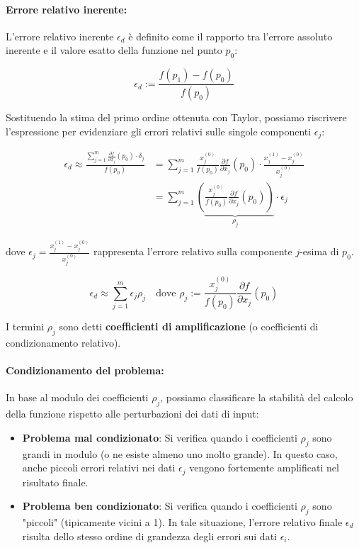 \documentclass[a4paper,12pt]{article}
\begin{document}
	\paragraph{Errore relativo inerente:}
	L'errore relativo inerente $\epsilon_d$ è definito come il rapporto tra l'errore assoluto inerente e il valore esatto della funzione nel punto $p_0$:
	
	\begin{equation}
		\epsilon_d := \frac{f(p_1) - f(p_0)}{f(p_0)}
	\end{equation}
	
	Sostituendo la stima del primo ordine ottenuta con Taylor, possiamo riscrivere l'espressione per evidenziare gli errori relativi sulle singole componenti $\epsilon_j$:
	
	\begin{align*}
		\epsilon_d \approx \frac{\sum_{j=1}^{m} \frac{\partial f}{\partial x_j}(p_0) \cdot \delta_j}{f(p_0)} &= \sum_{j=1}^{m} \frac{x_j^{(0)}}{f(p_0)} \frac{\partial f}{\partial x_j}(p_0) \cdot \frac{x_j^{(1)} - x_j^{(0)}}{x_j^{(0)}} \\
		&= \sum_{j=1}^{m} \underbrace{\left( \frac{x_j^{(0)}}{f(p_0)} \frac{\partial f}{\partial x_j}(p_0) \right)}_{\rho_j} \cdot \epsilon_j
	\end{align*}
	
	dove $\epsilon_j = \frac{x_j^{(1)} - x_j^{(0)}}{x_j^{(0)}}$ rappresenta l'errore relativo sulla componente $j$-esima di $p_0$.
	
	\begin{tcolorbox}[colback=yellow!10!white, colframe=yellow!50!black]
		\[ \epsilon_d \approx \sum_{j=1}^{m} \epsilon_j \rho_j \quad \text{dove } \rho_j := \frac{x_j^{(0)}}{f(p_0)} \frac{\partial f}{\partial x_j}(p_0) \]
	\end{tcolorbox}
	
	I termini $\rho_j$ sono detti \textbf{coefficienti di amplificazione} (o coefficienti di condizionamento relativo).
	
	\paragraph{Condizionamento del problema:}
	In base al modulo dei coefficienti $\rho_j$, possiamo classificare la stabilità del calcolo della funzione rispetto alle perturbazioni dei dati di input:
	
	\begin{itemize}
		\item \textbf{Problema mal condizionato}: Si verifica quando i coefficienti $\rho_j$ sono grandi in modulo (o ne esiste almeno uno molto grande). In questo caso, anche piccoli errori relativi nei dati $\epsilon_j$ vengono fortemente amplificati nel risultato finale.
		\item \textbf{Problema ben condizionato}: Si verifica quando i coefficienti $\rho_j$ sono "piccoli" (tipicamente vicini a 1). In tale situazione, l'errore relativo finale $\epsilon_d$ risulta dello stesso ordine di grandezza degli errori sui dati $\epsilon_i$.
	\end{itemize}
\end{document}
